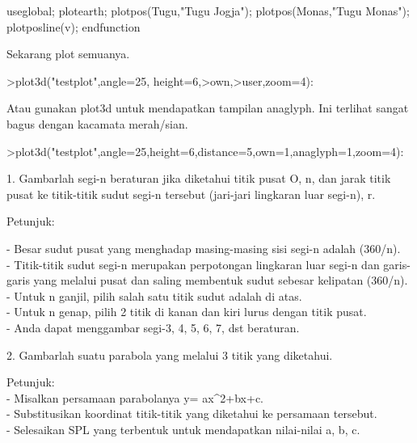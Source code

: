 \documentclass{article}
\begin{document}
\begin{eulernotebook}
\begin{eulercomment}
\begin{eulercomment}
\begin{eulercomment}
\begin{eulercomment}
\begin{eulerudf}
  useglobal;
  plotearth;
  plotpos(Tugu,"Tugu Jogja"); plotpos(Monas,"Tugu Monas");
  plotposline(v);
  endfunction
\end{eulerudf}
\begin{eulercomment}
Sekarang plot semuanya.
\end{eulercomment}
\begin{eulerprompt}
>plot3d("testplot",angle=25, height=6,>own,>user,zoom=4):
\end{eulerprompt}
\begin{eulercomment}
Atau gunakan plot3d untuk mendapatkan tampilan anaglyph. Ini terlihat
sangat bagus dengan kacamata merah/sian.
\end{eulercomment}
\begin{eulerprompt}
>plot3d("testplot",angle=25,height=6,distance=5,own=1,anaglyph=1,zoom=4):
\end{eulerprompt}
\begin{eulercomment}
1. Gambarlah segi-n beraturan jika diketahui titik pusat O, n, dan jarak titik pusat ke
titik-titik sudut segi-n tersebut (jari-jari lingkaran luar segi-n), r.

Petunjuk:

- Besar sudut pusat yang menghadap masing-masing sisi segi-n adalah (360/n).\\
- Titik-titik sudut segi-n merupakan perpotongan lingkaran luar segi-n dan garis-garis yang
melalui pusat dan saling membentuk sudut sebesar kelipatan (360/n).\\
- Untuk n ganjil, pilih salah satu titik sudut adalah di atas.\\
- Untuk n genap, pilih 2 titik di kanan dan kiri lurus dengan titik pusat.\\
- Anda dapat menggambar segi-3, 4, 5, 6, 7, dst beraturan.

2. Gambarlah suatu parabola yang melalui 3 titik yang diketahui.

Petunjuk:\\
- Misalkan persamaan parabolanya y= ax\textasciicircum{}2+bx+c.\\
- Substitusikan koordinat titik-titik yang diketahui ke persamaan tersebut.\\
- Selesaikan SPL yang terbentuk untuk mendapatkan nilai-nilai a, b, c.


\end{eulercomment}
\end{eulercomment}
\end{eulercomment}
\end{eulercomment}
\end{eulercomment}
\end{eulernotebook}
\end{document}

